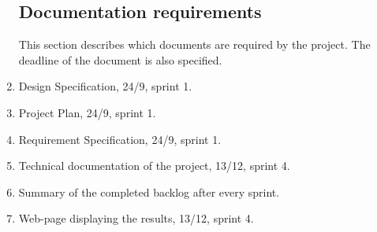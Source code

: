 \documentclass[10pt,a4paper]{article}
\begin{document}
\begin{enumerate}
\subsection{Documentation requirements}
This section describes which documents are required by the project. The deadline of the document is also specified.
\item Design Specification, 24/9, sprint 1.
\item Project Plan, 24/9, sprint 1.
\item Requirement Specification, 24/9, sprint 1.
\item Technical documentation of the project, 13/12,  sprint 4.
\item Summary of the completed backlog after every sprint.
\item Web-page displaying the results, 13/12, sprint 4.




\end{enumerate}
\end{document}
